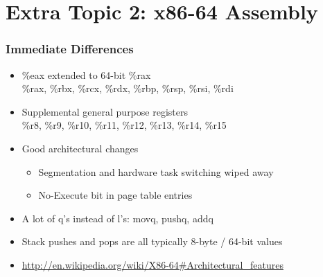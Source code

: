 \documentclass[11pt,xcolor=dvipsnames]{beamer}
\newcommand{\vs}{\vspace{0.5em}}
\begin{document}
\section{Extra Topic 2: x86-64 Assembly}

\begin{frame}[fragile,t]
\frametitle{Immediate Differences}
\begin{itemize}
  \item {\ttfamily \%eax} extended to 64-bit {\ttfamily \%rax} \\
  {\ttfamily \%rax, \%rbx, \%rcx, \%rdx, \%rbp, \%rsp, \%rsi, \%rdi}
  \item Supplemental general purpose registers \\
  {\ttfamily \%r8, \%r9, \%r10, \%r11, \%r12, \%r13, \%r14, \%r15}
  \vs \vs
  \item Good architectural changes
  \begin{itemize}
    \item Segmentation and hardware task switching wiped away
    \item No-Execute bit in page table entries
  \end{itemize}
  \vs
  \item A lot of q's instead of l's: {\ttfamily movq, pushq, addq}
  \item Stack pushes and pops are all typically 8-byte / 64-bit values
  \item {\small \url{http://en.wikipedia.org/wiki/X86-64#Architectural\_features}}
\end{itemize}
\end{frame}
\end{document}
